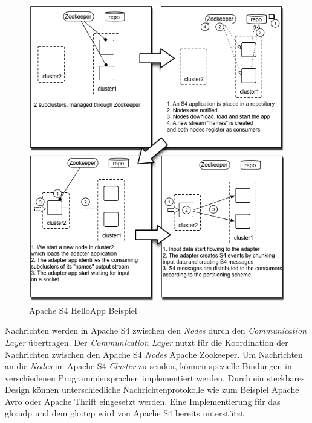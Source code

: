\begin{figure}[htb!]
\centering
\includegraphics[width=1.0\textwidth]{bilder/s4SampleAppDeployment.png}
\caption{Apache S4 HelloApp Beispiel
\label{fig:s4HelloApp}}
\end{figure}

Nachrichten werden in Apache S4 zwischen den \textit{Nodes} durch den \textit{Communication Layer} übertragen. Der \textit{Communication Layer} nutzt für die Koordination der Nachrichten zwischen den Apache S4 \textit{Nodes} Apache Zookeeper. Um Nachrichten an die \textit{Nodes} im Apache S4 \textit{Cluster} zu senden, können spezielle Bindungen in verschiedenen Programmiersprachen implementiert werden. Durch ein steckbares Design können unterschiedliche Nachrichtenprotokolle wie zum Beispiel Apache Avro oder Apache Thrift eingesetzt werden. Eine Implementierung für das \gls{glo:udp}  und dem \gls{glo:tcp}  wird von Apache S4 bereits unterstützt. 


